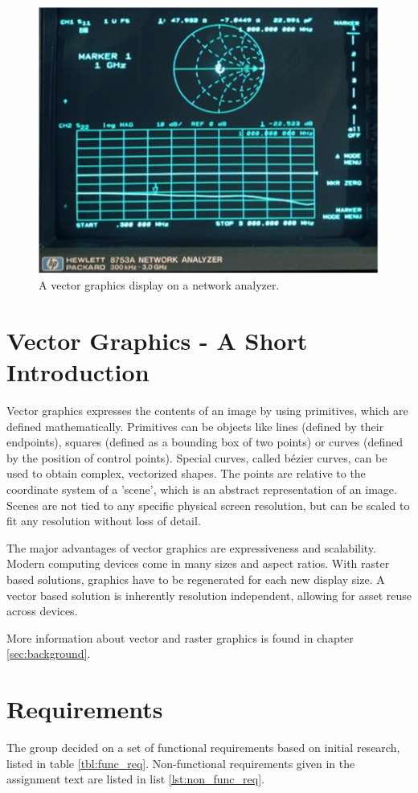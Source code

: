 \begin{figure}[h!]
    \centering
    \includegraphics[width=0.6\linewidth]{images/network-analyzer-vector-graphics-display.png}
    \caption{A vector graphics display on a network analyzer\cite{assignment-text}.}
    \label{fig:vector-display-network-analyzer}
\end{figure}

\section{Vector Graphics - A Short Introduction}
Vector graphics expresses the contents of an image by using primitives, which are defined mathematically.
Primitives can be objects like lines (defined by their endpoints), squares (defined as a bounding box of two points) or curves (defined by the position of control points). 
Special curves, called bézier curves, can be used to obtain complex, vectorized shapes.
The points are relative to the coordinate system of a 'scene', which is an abstract representation of an image.
Scenes are not tied to any specific physical screen resolution, but can be scaled to fit any resolution without loss of detail.

The major advantages of vector graphics are expressiveness and scalability.
Modern computing devices come in many sizes and aspect ratios.
With raster based solutions, graphics have to be regenerated for each new display size.
A vector based solution is inherently resolution independent, allowing for asset reuse across devices.

More information about vector and raster graphics is found in chapter \ref{sec:background}.

\section{Requirements}
The group decided on a set of functional requirements based on initial research, listed in table \ref{tbl:func_req}.
Non-functional requirements given in the assignment text are listed in list \ref{lst:non_func_req}.

